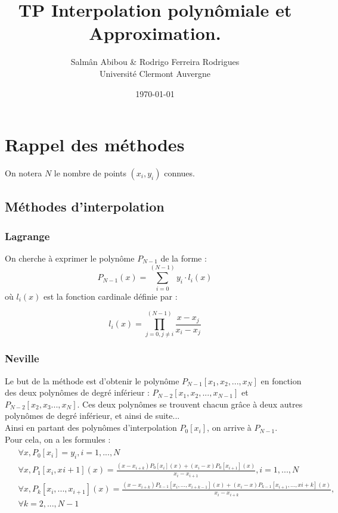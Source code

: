 \documentclass[12pt,french,titlepage]{article}
\title{TP Interpolation polynômiale et Approximation.}
\author{Salmân Abibou \& Rodrigo Ferreira Rodrigues \\
Université Clermont Auvergne\\}
\date{\today}
\begin{document}
	\maketitle


	\tableofcontents
	\newpage
	
	\section{Rappel des méthodes}
	On notera $N$ le nombre de points $(x_i,y_i)$ connues.
	\subsection{Méthodes d'interpolation}
	
	\subsubsection{Lagrange}

	On cherche à exprimer le polynôme $P_{N-1}$ de la forme :
	\begin{equation}
	P_{N-1}(x) = \sum_{i=0}^{(N-1)}y_i\cdot l_i(x) \label{lagrange}
	\end{equation}
	où $l_i(x)$ est la fonction cardinale définie par :
	
	\begin{equation}
	l_i(x) = \prod_{j=0,j\neq i}^{(N-1)}\frac{x - x_j}{x_i - x_j} \label{cardinale}
	\end{equation}
	
	\subsubsection{Neville}
	
	Le but de la méthode est d'obtenir le polynôme $P_{N-1}[x_1,x_2,... ,x_N]$ en fonction des deux polynômes de degré inférieur : $P_{N-2}[x_1,x_2,... ,x_{N-1}]$ et $P_{N-2}[x_2,x_3... ,x_{N}]$. Ces deux polynômes se trouvent chacun grâce à deux autres polynômes de degré inférieur, et ainsi de suite...\\
	Ainsi en partant des polynômes d'interpolation $P_0[x_i]$, on arrive à $P_{N-1}$.\\
	Pour cela, on a les formules :\\
	\begin{align}
		\begin{split}
	&\forall x,P_0[x_i]=y_i,i=1,...,N\\
	&\forall x,P_1[x_i,x_{}i+1](x)=\frac{(x-x_{i+k})P_{0}[x_i](x)+(x_i-x)P_{0}[x_{i+1}](x)}{x_i-x_{i+1}},i=1,...,N\\
	&\forall x,P_k[x_i,...,x_{i+1}](x)=\frac{(x-x_{i+k})P_{k-1}[x_i,...,x_{i+k-1}](x)+(x_i-x)P_{k-1}[x_{i+1},...,x{i+k}](x)}{x_i-x_{i+k}},\\ \label{neville}
	&\forall k=2,...,N-1
		\end{split}
	\end{align}
	
\end{document}
